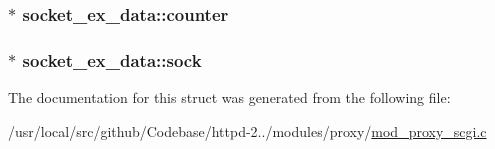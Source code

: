 \subsubsection[{\texorpdfstring{counter}{counter}}]{$\ast$ socket\+\_\+ex\+\_\+data\+::counter}\hypertarget{structsocket__ex__data_a3168a40f51622d10f845e5c9228a7407}{}\label{structsocket__ex__data_a3168a40f51622d10f845e5c9228a7407}
\subsubsection[{\texorpdfstring{sock}{sock}}]{$\ast$ socket\+\_\+ex\+\_\+data\+::sock}\hypertarget{structsocket__ex__data_aaba3d50d6fab1225a5c3fc6567ffe145}{}\label{structsocket__ex__data_aaba3d50d6fab1225a5c3fc6567ffe145}


The documentation for this struct was generated from the following file\+:\begin{DoxyCompactItemize}
\item 
/usr/local/src/github/\+Codebase/httpd-\/2../modules/proxy/\hyperlink{mod__proxy__scgi_8c}{mod\+\_\+proxy\+\_\+scgi.\+c}\end{DoxyCompactItemize}
